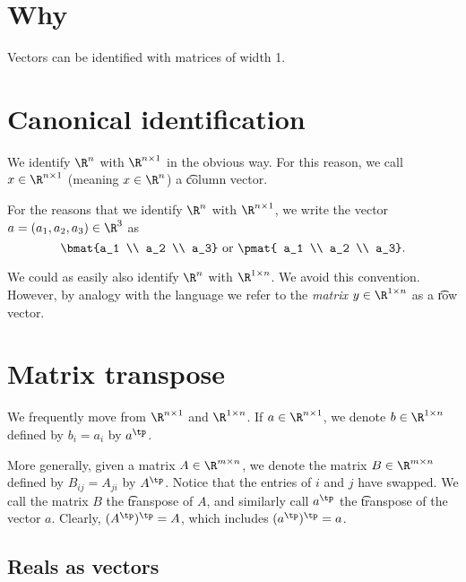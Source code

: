 
\section*{Why}

Vectors can be identified with matrices of width 1.

\section*{Canonical identification}

We identify $\R ^{n}$ with $\R ^{n \times 1}$ in the obvious way.
For this reason, we call $x \in \R ^{n \times 1}$ (meaning $x \in \R ^{n}$) a \t{column vector}.

For the reasons that we identify $\R ^n$ with $\R ^{n \times 1}$, we write the vector $a = (a_1, a_2, a_3) \in \R ^3$ as
  \[
\bmat{a_1 \\ a_2 \\ a_3}
\text{ or }
\pmat{ a_1 \\ a_2 \\ a_3}.
  \]

We could as easily also identify $\R ^{n}$ with $\R ^{1 \times n}$.
We avoid this convention.
However, by analogy with the language  we refer to the \textit{matrix} $y \in \R ^{1 \times n}$ as a \t{row vector}.

\section*{Matrix transpose}

We frequently move from $\R ^{n \times 1}$ and $\R ^{1 \times n}$.
If $a \in \R ^{n \times 1}$, we denote $b \in \R ^{1 \times n}$ defined by $b_i = a_i$ by $a^\tp$.

More generally, given a matrix $A \in \R ^{m \times n}$, we denote the matrix $B \in \R ^{m \times n}$ defined by $B_{ij} = A_{ji}$ by $A^\tp$.
Notice that the entries of $i$ and $j$ have swapped.
We call the matrix $B$ the \t{transpose} of $A$, and similarly call $a^\tp$ the \t{transpose} of the vector $a$.
Clearly, $(A^\tp)^\tp = A$, which includes $(a^\tp)^\tp = a$.

\subsection*{Reals as vectors}

